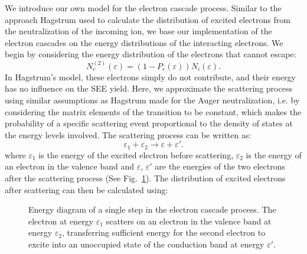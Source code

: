\begin{refsection}
We introduce our own model for the electron cascade process. Similar to the 
approach Hagstrum used to calculate the distribution of excited electrons from 
the neutralization of the incoming ion, we base our implementation of the 
electron cascades on the energy distributions of the interacting electrons. We 
begin by considering the energy distribution of the electrons that cannot 
escape: 
\begin{equation} 
N_c^{(2)}(\varepsilon) = (1-P_e(\varepsilon))N_i(\varepsilon). 
\end{equation} 
In Hagstrum's model, these electrons simply do not contribute, and their 
energy has no influence on the SEE yield. Here, we approximate the scattering 
process using similar assumptions as Hagstrum made for the Auger 
neutralization, i.e. by considering the matrix elements of the transition to 
be constant, which makes the probability of a specific scattering event 
proportional to the density of states at the energy levels involved. The 
scattering process can be written as: 
\begin{equation}\label{quotas:eq-scattering} 
\varepsilon_1 + \varepsilon_2 \rightarrow \varepsilon + \varepsilon'. 
\end{equation} 
where $\varepsilon_1$ is the energy of the excited electron before scattering, 
$\varepsilon_2$ is the energy of an electron in the valence band and 
$\varepsilon$, $\varepsilon'$ are the energies of the two electrons after the 
scattering process (See Fig.~\ref{quotas:fig-cascades}). The distribution of 
excited electrons after scattering can then be calculated using: 

\begin{figure}[ht] 
\centering 
\captionsetup{width=0.9\textwidth}
 
\caption{\label{quotas:fig-cascades}Energy diagram of a single step in the 
electron cascade process. The electron at energy $\varepsilon_1$ scatters on 
an electron in the valence band at energy $\varepsilon_2$, transferring 
sufficient energy for the second electron to excite into an unoccupied state 
of the conduction band at energy $\varepsilon'$.} 
\end{figure} 


\end{refsection}
